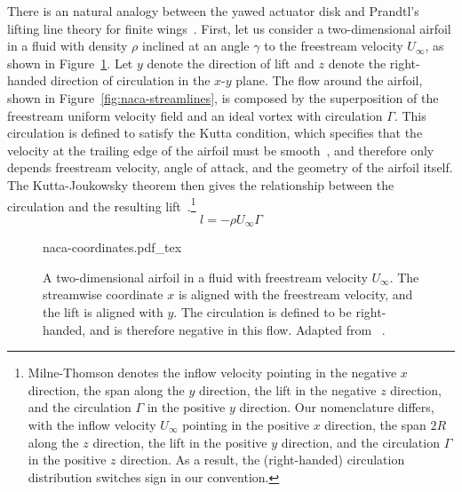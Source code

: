There is an natural analogy between the yawed actuator disk and Prandtl's lifting line theory for finite wings~\cite{Milne-Thomson1973a}. First, let us consider a two-dimensional airfoil in a fluid with density $\rho$ inclined at an angle $\gamma$ to the freestream velocity $U_\infty$, as shown in Figure~\ref{fig:naca-coordinates}. Let $y$ denote the direction of lift and $z$ denote the right-handed direction of circulation in the $x$-$y$ plane. The flow around the airfoil, shown in Figure~\ref{fig:naca-streamlines}, is composed by the superposition of the freestream uniform velocity field and an ideal vortex with circulation $\Gamma$. This circulation is defined to satisfy the Kutta condition, which specifies that the velocity at the trailing edge of the airfoil must be smooth~\cite[pg. 211]{Houghton2013a}, and therefore only depends freestream velocity, angle of attack, and the geometry of the airfoil itself. The Kutta-Joukowsky theorem then gives the relationship between the circulation and the resulting lift~\cite[pg. 92]{Milne-Thomson1973a}.\footnote{Milne-Thomson denotes the inflow velocity pointing in the negative $x$ direction, the span along the $y$ direction, the lift in the negative $z$ direction, and the circulation $\Gamma$ in the positive $y$ direction. Our nomenclature differs, with the inflow velocity $U_\infty$ pointing in the positive $x$ direction, the span $2R$ along the $z$ direction, the lift in the positive $y$ direction, and the circulation $\Gamma$ in the positive $z$ direction. As a result, the (right-handed) circulation distribution switches sign in our convention.}
\begin{equation}
\label{eq:kuta-joukowsky}
l = - \rho U_\infty \Gamma
\end{equation}

\begin{figure}
\begin{center}
{naca-coordinates.pdf_tex}
\end{center}
\caption{\label{fig:naca-coordinates} A two-dimensional airfoil in a fluid with freestream velocity $U_\infty$. The streamwise coordinate $x$ is aligned with the freestream velocity, and the lift is aligned with $y$. The circulation is defined to be right-handed, and is therefore negative in this flow. Adapted from ~\cite{Belisle2008a}.}%
\end{figure}


